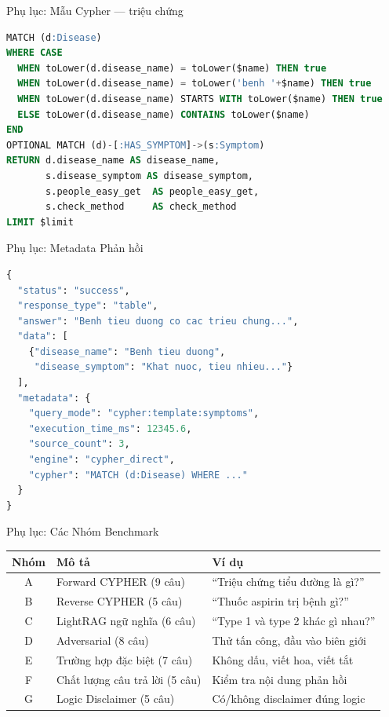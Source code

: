 \documentclass[aspectratio=169, 11pt]{beamer}
\begin{document}
\appendix

\begin{frame}{Phụ lục: Mẫu Cypher --- triệu chứng}
\begin{lstlisting}[language=SQL]
MATCH (d:Disease)
WHERE CASE
  WHEN toLower(d.disease_name) = toLower($name) THEN true
  WHEN toLower(d.disease_name) = toLower('benh '+$name) THEN true
  WHEN toLower(d.disease_name) STARTS WITH toLower($name) THEN true
  ELSE toLower(d.disease_name) CONTAINS toLower($name)
END
OPTIONAL MATCH (d)-[:HAS_SYMPTOM]->(s:Symptom)
RETURN d.disease_name AS disease_name,
       s.disease_symptom AS disease_symptom,
       s.people_easy_get  AS people_easy_get,
       s.check_method     AS check_method
LIMIT $limit
\end{lstlisting}
\end{frame}

\begin{frame}{Phụ lục: Metadata Phản hồi}
\begin{lstlisting}[language=Python]
{
  "status": "success",
  "response_type": "table",
  "answer": "Benh tieu duong co cac trieu chung...",
  "data": [
    {"disease_name": "Benh tieu duong",
     "disease_symptom": "Khat nuoc, tieu nhieu..."}
  ],
  "metadata": {
    "query_mode": "cypher:template:symptoms",
    "execution_time_ms": 12345.6,
    "source_count": 3,
    "engine": "cypher_direct",
    "cypher": "MATCH (d:Disease) WHERE ..."
  }
}
\end{lstlisting}
\end{frame}

\begin{frame}[noframenumbering]{Phụ lục: Các Nhóm Benchmark}
  \scriptsize
  \begin{center}
  \begin{tabular}{cll}
    \toprule
    \textbf{Nhóm} & \textbf{Mô tả} & \textbf{Ví dụ}\\
    \midrule
    A & Forward CYPHER (9 câu) & ``Triệu chứng tiểu đường là gì?''\\
    B & Reverse CYPHER (5 câu) & ``Thuốc aspirin trị bệnh gì?''\\
    C & LightRAG ngữ nghĩa (6 câu) & ``Type 1 và type 2 khác gì nhau?''\\
    D & Adversarial (8 câu) & Thử tấn công, đầu vào biên giới\\
    E & Trường hợp đặc biệt (7 câu) & Không dấu, viết hoa, viết tắt\\
    F & Chất lượng câu trả lời (5 câu) & Kiểm tra nội dung phản hồi\\
    G & Logic Disclaimer (5 câu) & Có/không disclaimer đúng logic\\
    \bottomrule
  \end{tabular}
  \end{center}
\end{frame}
\end{document}

